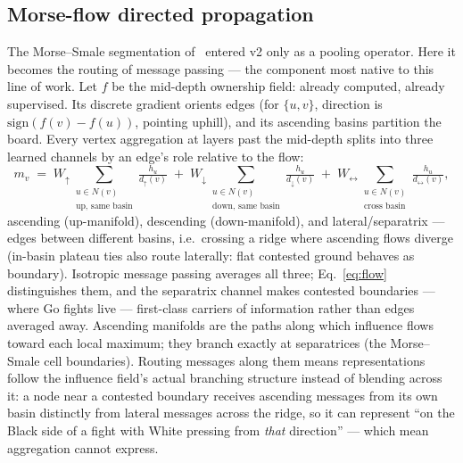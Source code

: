 \documentclass[11pt]{article}
\begin{document}
\subsection{Morse-flow directed propagation}
\label{sec:morseflow}
The Morse--Smale segmentation of~\cite{leventhal2022} entered v2 only as
a pooling operator. Here it becomes the routing of message passing ---
the component most native to this line of work. Let $f$ be the mid-depth
ownership field: already computed, already supervised. Its discrete
gradient orients edges (for $\{u,v\}$, direction is
$\mathrm{sign}(f(v)-f(u))$, pointing uphill), and its ascending basins
partition the board. Every vertex aggregation at layers past the
mid-depth splits into three learned channels by an edge's role relative
to the flow:
\begin{equation}
m_v \;=\; W_{\uparrow}\!\!\sum_{\substack{u\in N(v)\\ \text{up, same
basin}}}\!\!\tfrac{h_u}{d_\uparrow(v)}
\;+\; W_{\downarrow}\!\!\sum_{\substack{u\in N(v)\\ \text{down, same
basin}}}\!\!\tfrac{h_u}{d_\downarrow(v)}
\;+\; W_{\leftrightarrow}\!\!\sum_{\substack{u\in N(v)\\ \text{cross
basin}}}\!\!\tfrac{h_u}{d_\leftrightarrow(v)},
\label{eq:flow}
\end{equation}
ascending (up-manifold), descending (down-manifold), and
lateral/separatrix --- edges between different basins, i.e.\ crossing a
ridge where ascending flows diverge (in-basin plateau ties also route
laterally: flat contested ground behaves as boundary). Isotropic message
passing averages all three; Eq.~\ref{eq:flow} distinguishes them, and the
separatrix channel makes contested boundaries --- where Go fights live
--- first-class carriers of information rather than edges averaged away.
Ascending manifolds are the paths along which influence flows toward each
local maximum; they branch exactly at separatrices (the Morse--Smale
cell boundaries). Routing messages along them means representations
follow the influence field's actual branching structure instead of
blending across it: a node near a contested boundary receives ascending
messages from its own basin distinctly from lateral messages across the
ridge, so it can represent ``on the Black side of a fight with White
pressing from \emph{that} direction'' --- which mean aggregation cannot
express.
\end{document}

